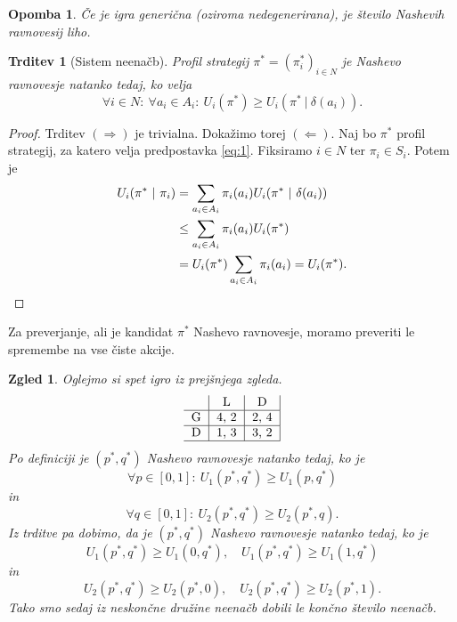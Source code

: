 \documentclass[10pt, a4paper]{article}
\newtheorem{trditev}[izr]{Trditev}
\newtheorem*{opomba}{Opomba}
\newtheorem{zgled}[izr]{Zgled}
\newenvironment{noticeC}{%
  \tcolorbox[%
  notitle,
  empty,
  enhanced,  %
  breakable,
  coltext=black, 
  fontupper=\rmfamily,
  noparskip,
  sharp corners,
  boxrule=-1pt,  %
  frame hidden,
  left=7pt,  %
  right=7pt,
  top=5pt,
  bottom=5pt,
  before skip=2.5ex plus 2pt,
  after skip=2.5ex plus 2pt,
  overlay unbroken and last={%
  },
  ]}
{\endtcolorbox}
\newenvironment{dokaz}%
  {\begin{noticeC}\begin{proof}}%
  {\end{proof}\end{noticeC}}
\begin{document}
\begin{opomba}
  Če je igra generična (oziroma nedegenerirana), je število Nashevih ravnovesij liho.
\end{opomba}

\begin{trditev}[Sistem neenačb]
  Profil strategij $\pi^* = (\pi^* _i)_{i \in N}$ je Nashevo ravnovesje natanko tedaj, ko velja 
  \begin{equation*}
    \forall i \in N:\ \forall a_i \in A_i:\ U_i (\pi^*) \geq U_i (\pi^*\ |\ \delta (a_i)). \label{eq:1}
  \end{equation*}
\end{trditev}

\begin{dokaz}
  Trditev $(\Rightarrow)$ je trivialna.
  Dokažimo torej $(\Leftarrow)$. Naj bo $\pi^*$ profil strategij, za katero velja predpostavka \ref{eq:1}.
  Fiksiramo $i \in N$ ter $\pi_i \in S_i$. Potem je 
  \begin{align*}
    U_i(\pi^*\ |\ \pi_i) &= \sum_{a_i \in A_i} \pi_i (a_i) U_i (\pi^*\ |\ \delta(a_i))\\
    &\leq \sum_{a_i \in A_i} \pi_i (a_i) U_i (\pi^*)\\
    &= U_i(\pi^*) \sum_{a_i \in A_i} \pi_i(a_i) = U_i(\pi^*). \qedhere
  \end{align*}
\end{dokaz}

Za preverjanje, ali je kandidat $\pi^*$ Nashevo ravnovesje, moramo preveriti le spremembe na vse čiste akcije.

\begin{zgled}
  Oglejmo si spet igro iz prejšnjega zgleda.
  $$
  \begin{tabular}{c|c|c|}
    & \textrm{L} & \textrm{D}\\
    \hline
    \textrm{G} & 4, 2 & 2, 4\\
    \hline
    \textrm{D} & 1, 3 & 3, 2\\
    \hline
  \end{tabular}
  $$
  Po definiciji je $(p^*, q^*)$ Nashevo ravnovesje natanko tedaj, ko je 
  $$\forall p \in [0, 1]:\ U_1 (p^*, q^*) \geq U_1 (p, q^*)$$
  in $$\forall q \in [0, 1]:\ U_2 (p^*, q^*) \geq U_2 (p^*, q).$$
  Iz trditve pa dobimo, da je $(p^*, q^*)$ Nashevo ravnovesje natanko tedaj, ko je 
  $$U_1 (p^*, q^*) \geq U_1 (0, q^*),\quad U_1 (p^*, q^*) \geq U_1 (1, q^*)$$ in 
  $$U_2 (p^*, q^*) \geq U_2 (p^*, 0),\quad U_2 (p^*, q^*) \geq U_2 (p^*, 1).$$
  Tako smo sedaj iz neskončne družine neenačb dobili le končno število neenačb.
\end{zgled}
\end{document}

